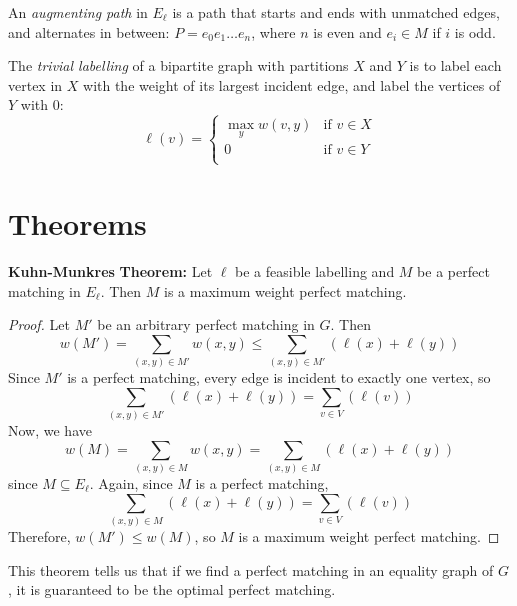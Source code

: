 \documentclass[12pt]{article}
\newcommand{\thm}{\noindent \textbf{Theorem: }}
\newcommand{\lskip}{\vspace{\baselineskip}}
\begin{document}
\noindent An \emph{augmenting path} in $E_\ell$ is a path that starts and ends with unmatched edges, and alternates in between: $P = e_0 e_1\ldots e_n$, where $n$ is even and $e_i \in M$ if $i$ is odd.\lskip

\noindent The \emph{trivial labelling} of a bipartite graph with partitions $X$ and $Y$ is to label each vertex in $X$ with the weight of its largest incident edge, and label the vertices of $Y$ with 0:
\[ \ell(v) =
  \begin{cases}
    \max_{y} w(v,y) & \text{if } v \in X \\
    0 & \text{if } v \in Y \\
  \end{cases}
\]

\section*{Theorems}

\textbf{Kuhn-Munkres} \thm Let $\ell$ be a feasible labelling and $M$ be a perfect matching in $E_\ell$. Then $M$ is a maximum weight perfect matching.

\begin{proof}
  Let $M'$ be an arbitrary perfect matching in $G$. Then
  \[ w(M') = \sum_{(x,y) \in M'} w(x,y) \leq \sum_{(x,y) \in M'}(\ell(x) + \ell(y)) \]
  Since $M'$ is a perfect matching, every edge is incident to exactly one vertex, so \[ \sum_{(x,y) \in M'}(\ell(x) + \ell(y)) = \sum_{v \in V}(\ell(v)) \]
  Now, we have
  \[ w(M) = \sum_{(x,y) \in M} w(x,y) = \sum_{(x,y) \in M}(\ell(x) + \ell(y)) \]
  since $M \subseteq E_\ell$.
  Again, since $M$ is a perfect matching,
  \[ \sum_{(x,y) \in M}(\ell(x) + \ell(y)) = \sum_{v \in V}(\ell(v)) \]
  Therefore, $w(M') \leq w(M)$, so $M$ is a maximum weight perfect matching.
\end{proof}

This theorem tells us that if we find a perfect matching in an equality graph of $G$, it is guaranteed to be the optimal perfect matching.\lskip
\lskip
\end{document}
